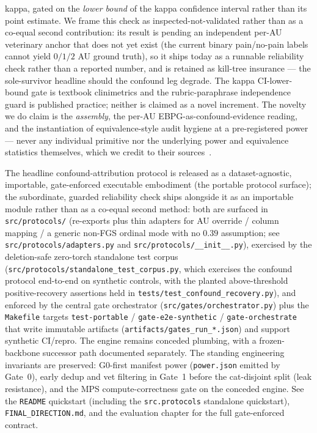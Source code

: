kappa, gated on the \emph{lower bound} of the kappa confidence interval rather
than its point estimate. We frame this check as inspected-not-validated rather
than as a co-equal second contribution: its result is pending an independent
per-AU veterinary anchor that does not yet exist (the current binary
pain/no-pain labels cannot yield $0/1/2$ AU ground truth), so it ships today as
a runnable reliability check rather than a reported number, and is retained as
kill-tree insurance --- the sole-survivor headline should the confound leg
degrade. The kappa CI-lower-bound gate is textbook clinimetrics and the
rubric-paraphrase independence guard is published practice; neither is claimed
as a novel increment. The novelty we do claim is the \emph{assembly}, the
per-AU EBPG-as-confound-evidence reading, and the instantiation of
equivalence-style audit hygiene at a pre-registered power --- never any
individual primitive nor the underlying power and equivalence statistics
themselves, which we credit to their
sources~\cite{huanghooker2026fairness,singh2023samplesize}.

The headline confound-attribution protocol is released as a dataset-agnostic,
importable, gate-enforced executable embodiment (the portable protocol surface);
the subordinate, guarded reliability check ships alongside it as an importable
module rather than as a co-equal second method: both are surfaced in
\texttt{src/protocols/} (re-exports plus thin adapters for
AU override / column mapping / a generic non-FGS ordinal mode with no $0.39$
assumption; see \texttt{src/protocols/adapters.py} and
\texttt{src/protocols/\_\_init\_\_.py}), exercised by the deletion-safe
zero-torch standalone test corpus
(\texttt{src/protocols/standalone\_test\_corpus.py}, which exercises the
confound protocol end-to-end on synthetic controls, with the planted
above-threshold positive-recovery assertions held in
\texttt{tests/test\_confound\_recovery.py}), and enforced by
the central gate orchestrator (\texttt{src/gates/orchestrator.py}) plus the
\texttt{Makefile} targets \texttt{test-portable} / \texttt{gate-e2e-synthetic}
/ \texttt{gate-orchestrate} that write immutable artifacts
(\texttt{artifacts/gates\_run\_*.json}) and support synthetic CI/repro. The
engine remains conceded plumbing, with a frozen-backbone successor path
documented separately. The standing engineering invariants are preserved:
G0-first manifest power (\texttt{power.json} emitted by Gate~0), early dedup and
vet filtering in Gate~1 before the cat-disjoint split (leak resistance), and the
MPS compute-correctness gate on the conceded engine. See the
\texttt{README} quickstart (including the \texttt{src.protocols} standalone
quickstart), \texttt{FINAL\_DIRECTION.md}, and the evaluation chapter for the
full gate-enforced contract.

